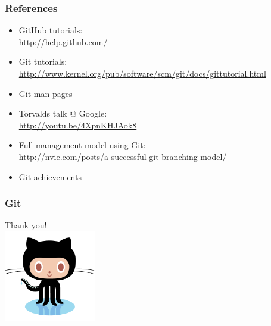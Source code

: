 \documentclass[handout]{beamer}
\begin{document}
\begin{frame}
  \frametitle{References}
  \begin{itemize}
    \item GitHub tutorials: \\
      \url{http://help.github.com/}
    \item Git tutorials: \\
      \url{http://www.kernel.org/pub/software/scm/git/docs/gittutorial.html}
    \item Git man pages
    \item Torvalds talk @ Google: \\
      \url{http://youtu.be/4XpnKHJAok8}
    \item Full management model using Git: \\
      \url{http://nvie.com/posts/a-successful-git-branching-model/}
    \item Git achievements
  \end{itemize}
\end{frame}

\begin{frame}
  \frametitle{Git}
    \begin{center}
      Thank you! \\
      \includegraphics[height=4cm]{Octocat.png}
    \end{center}
\end{frame}
\end{document}
